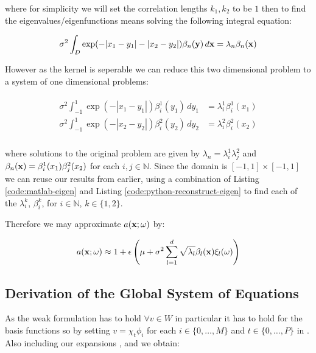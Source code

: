 where for simplicity we will set the correlation lengths $k_1, k_2$ to be $1$
then to find the eigenvalues/eigenfunctions means solving the following
integral equation:

\begin{equation}\label{eq:twod-stochastic-kl-eigenvalue-problem}
    \sigma^2\int_D\exp(-|x_1 - y_1| - |x_2 - y_2|)\beta_n(\mathbf{y})\, d\mathbf{x}
        = \lambda_n\beta_n(\mathbf{x})
\end{equation}

However as the kernel is seperable we can reduce this two dimensional problem
to a system of one dimensional problems:

\begin{align}
    \begin{split}
        \sigma^2\int_{-1}^1\exp(-|x_1 - y_1|)\beta^1_i(y_1)\, dy_1 &= \lambda^1_i\beta^1_i(x_1) \\
        \sigma^2\int_{-1}^1\exp(-|x_2 - y_2|)\beta^2_i(y_2)\, dy_2 &= \lambda^2_i\beta^2_i(x_2) \\
    \end{split}
\end{align}

where solutions to the original problem
 are given by $\lambda_n =
\lambda^1_i\lambda^2_j$ and $\beta_n(\mathbf{x}) = \beta^1_i(x_1)\beta^2_j(x_2)$ for
each $i, j \in \mathbb{N}$. Since the domain is $[-1, 1] \times [-1, 1]$ we can
reuse our results from earlier, using a combination of Listing
\ref{code:matlab-eigen} and Listing \ref{code:python-reconstruct-eigen} to find
each of the $\lambda_i^k$, $\beta_i^k$, for $i \in \mathbb{N}$, $k \in \{1,
2\}$.

Therefore we may approximate $a(\mathbf{x};\omega)$ by:

\begin{equation}\label{eq:twod-stochastic-kl-kappa}
    a(\mathbf{x};\omega) \approx 1 + \epsilon\left(
        \mu + \sigma^2\sum_{l=1}^d\sqrt{\lambda_l}\beta_l(\mathbf{x})\xi_l(\omega)
    \right)
\end{equation}

\subsection{Derivation of the Global System of Equations}

As the weak formulation  has to hold $\forall v
\in W$ in particular it has to hold for the basis functions so by setting
$v = \chi_t\phi_i$ for each $i \in \{0, \ldots, M\}$ and $t \in \{0, \ldots, P\}$
in . Also including our expansions
,  and
 we obtain:


